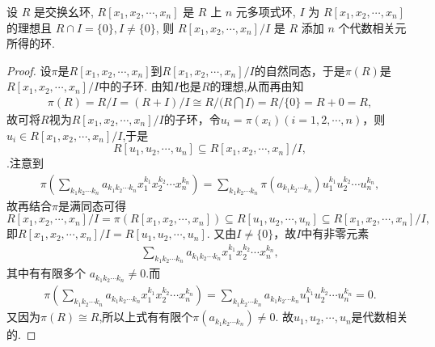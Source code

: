 \documentclass[../../main.tex]{subfiles}%
\begin{document}
\begin{corollary}
设 \( R \) 是交换幺环, \( R[x_1, x_2, \cdots, x_n] \) 是 \( R \) 上 \( n \) 元多项式环, \( I \) 为 \( R[x_1, x_2, \cdots, x_n] \) 的理想且 \( R \cap I = \{0\}, I \neq \{0\} \), 则 \( R[x_1, x_2, \cdots, x_n]/I \) 是 \( R \) 添加 \( n \) 个代数相关元所得的环.
\end{corollary}
\begin{proof}
设$\pi$是$R[x_1, x_2, \cdots, x_n]$到$R[x_1, x_2, \cdots, x_n]/I$的自然同态，于是$\pi(R)$是$R[x_1, x_2, \cdots, x_n]/I$中的子环. 由知$I$也是$R$的理想,从而再由知
\begin{align*}
\pi (R)=R/I=\left( R+I \right) /I\cong R/(R\bigcap{I)}=R/\{0\}=R+0=R,
\end{align*}
故可将$R$视为$R[x_1, x_2, \cdots, x_n]/I$的子环，令$u_i=\pi(x_i)(i=1,2,\cdots,n)$，则$u_i\in R[x_1, x_2, \cdots, x_n]/I$,于是$$R[u_1,u_2,\cdots ,u_n]\subseteq R[x_1, x_2, \cdots, x_n]/I,$$.注意到
\begin{align*}
\pi \left( \sum_{k_1k_2\cdots k_n}{a_{k_1k_2\cdots k_n}x_{1}^{k_1}x_{2}^{k_2}}\cdots x_{n}^{k_n} \right) =\sum_{k_1k_2\cdots k_n}{\pi \left( a_{k_1k_2\cdots k_n} \right) u_{1}^{k_1}u_{2}^{k_2}}\cdots u_{n}^{k_n},
\end{align*}
故再结合$\pi$是满同态可得
$$
R[x_1, x_2, \cdots, x_n]/I=\pi(R[x_1, x_2, \cdots, x_n])\subseteq R[u_1,u_2,\cdots ,u_n]\subseteq R[x_1, x_2, \cdots, x_n]/I,
$$
即$R[x_1, x_2, \cdots, x_n]/I=R[u_1,u_2,\cdots ,u_n]$. 又由$I\neq\{0\}$，故$I$中有非零元素
\begin{align*}
\sum_{k_1k_2\cdots k_n}{a_{k_1k_2\cdots k_n}x_{1}^{k_1}x_{2}^{k_2}}\cdots x_{n}^{k_n},
\end{align*}
其中有有限多个 \( a_{k_1 k_2 \cdots k_n} \neq 0 \).而
\begin{align*}
\pi \left( \sum_{k_1k_2\cdots k_n}{a_{k_1k_2\cdots k_n}x_{1}^{k_1}x_{2}^{k_2}}\cdots x_{n}^{k_n} \right) =\sum_{k_1k_2\cdots k_n}{a_{k_1k_2\cdots k_n}u_{1}^{k_1}u_{2}^{k_2}}\cdots u_{n}^{k_n}=0.
\end{align*}
又因为$\pi(R)\cong R$,所以上式有有限个$\pi(a_{k_1 k_2 \cdots k_n})\ne 0$.
故$u_1,u_2,\cdots,u_n$是代数相关的.
\end{proof}
\end{document}
